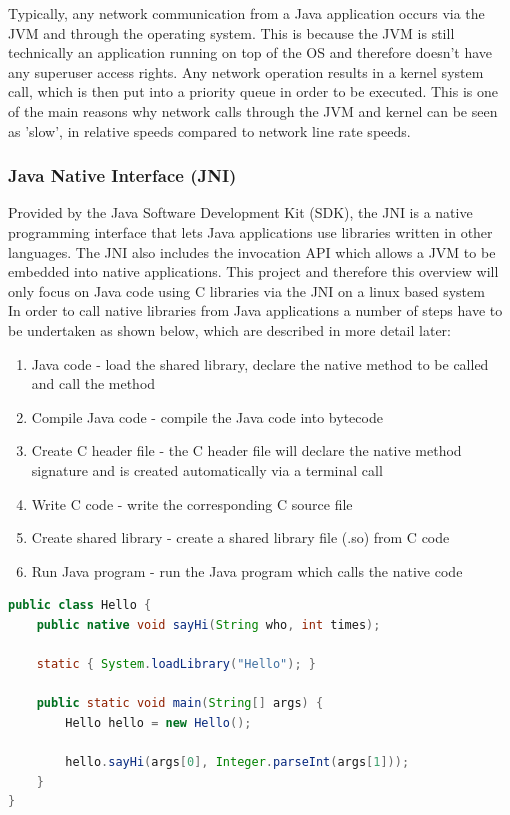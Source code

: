 \documentclass[interim_report.tex]{subfiles}
\begin{document}
Typically, any network communication from a Java application occurs via the JVM and through the operating system. This is because the JVM is still technically an application running on top of the OS and therefore doesn't have any superuser access rights. Any network operation results in a kernel system call, which is then put into a priority queue in order to be executed. This is one of the main reasons why network calls through the JVM and kernel can be seen as 'slow', in relative speeds compared to network line rate speeds.

\subsubsection{Java Native Interface (JNI)}
Provided by the Java Software Development Kit (SDK), the JNI is a native programming interface that lets Java applications use libraries written in other languages. The JNI also includes the invocation API which allows a JVM to be embedded into native applications. This project and therefore this overview will only focus on Java code using C libraries via the JNI on a linux based system\\
\newline
In order to call native libraries from Java applications a number of steps have to be undertaken as shown below, which are described in more detail later:
\begin{enumerate}
	\item Java code - load the shared library, declare the native method to be called and call the method
	\item Compile Java code - compile the Java code into bytecode
	\item Create C header file - the C header file will declare the native method signature and is created automatically via a terminal call
	\item Write C code - write the corresponding C source file
	\item Create shared library - create a shared library file (.so) from C code
	\item Run Java program - run the Java program which calls the native code
\end{enumerate}

\begin{lstlisting}[language=Java, caption={Basic Java class showing native method declaration and calling with shared library loading}, label=lst:java]
public class Hello {
    public native void sayHi(String who, int times);

    static { System.loadLibrary("Hello"); }

    public static void main(String[] args) {
        Hello hello = new Hello();
        
        hello.sayHi(args[0], Integer.parseInt(args[1]));
    }
}
\end{lstlisting}
\end{document}
